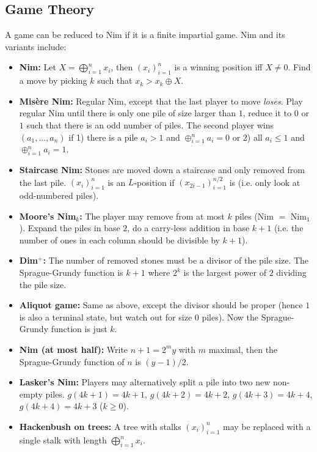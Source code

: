 \documentclass[9pt,a4paper,landscape,oneside]{amsart}
\newenvironment{myitemize}
{\begin{itemize}[leftmargin=.3cm]
	\setlength{\itemsep}{0pt}
	\setlength{\parskip}{0pt}
	\setlength{\parsep}{0pt}     }
{ \end{itemize}                  }
\begin{document}
\begin{multicols*}{3}
\section{Game Theory}
A game can be reduced to Nim if it is a finite impartial game.
Nim and its variants include:
\begin{myitemize}
	\item \textbf{Nim:} Let $X = \bigoplus_{i=1}^n x_i$, then $(x_i)_{i=1}^n$ is a winning position iff $X\neq 0$. Find a move by picking $k$ such that $x_k > x_k \oplus X$.
	\item \textbf{Mis\`{e}re Nim:} Regular Nim, except that the last player to move \textit{loses}. Play regular Nim until there is only one pile of size larger than $1$, reduce it to $0$ or $1$ such that there is an odd number of piles. The second player wins $(a_1, \dots, a_n)$ if 1) there is a pile $a_i > 1$ and $\oplus_{i=1}^{n} a_i = 0$ or 2) all $a_i \leq 1$ and $\oplus_{i=1}^{n} a_i = 1$.
	\item \textbf{Staircase Nim:} Stones are moved down a staircase and only removed from the last pile. $(x_i)_{i=1}^n$ is an $L$-position if $(x_{2i-1})_{i=1}^{n/2}$ is (i.e. only look at odd-numbered piles).
	\item \textbf{Moore's Nim$_k$:} The player may remove from at most $k$ piles (Nim $=$ Nim$_1$). Expand the piles in base $2$, do a carry-less addition in base $k+1$ (i.e. the number of ones in each column should be divisible by $k+1$).
	\item \textbf{Dim$^+$:} The number of removed stones must be a divisor of the pile size. The Sprague-Grundy function is $k+1$ where $2^k$ is the largest power of $2$ dividing the pile size.
	\item \textbf{Aliquot game:} Same as above, except the divisor should be proper (hence $1$ is also a terminal state, but watch out for size $0$ piles). Now the Sprague-Grundy function is just $k$.
	\item \textbf{Nim (at most half):} Write $n+1 = 2^my$ with $m$ maximal, then the Sprague-Grundy function of $n$ is $(y - 1) / 2$.
	\item \textbf{Lasker's Nim:} Players may alternatively split a pile into two new non-empty piles. $g(4k+1) = 4k+1$, $g(4k+2) = 4k+2$, $g(4k+3) = 4k+4$, $g(4k+4) = 4k+3$ ($k\geq 0$).
	\item \textbf{Hackenbush on trees:} A tree with stalks $(x_i)_{i=1}^n$ may be replaced with a single stalk with length $\bigoplus_{i=1}^n x_i$.
\end{myitemize}


\end{multicols*}
\end{document}
